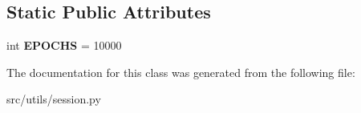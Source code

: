 \subsection*{Static Public Attributes}
\begin{DoxyCompactItemize}
\item 
int {\bfseries E\+P\+O\+C\+HS} = 10000\hypertarget{classsession_1_1TrainingContext_a53bfb4a5d3df06b4fc5947c906fb9adb}{}\label{classsession_1_1TrainingContext_a53bfb4a5d3df06b4fc5947c906fb9adb}

\end{DoxyCompactItemize}


The documentation for this class was generated from the following file\+:\begin{DoxyCompactItemize}
\item 
src/utils/session.\+py\end{DoxyCompactItemize}
